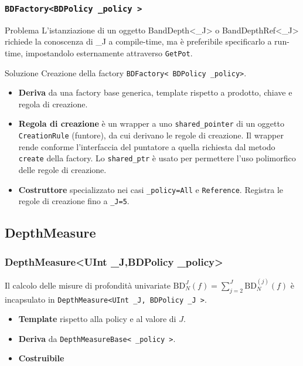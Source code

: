\documentclass[9pt]{beamer}
\begin{document}
\begin{frame}
 \frametitle{\tt BDFactory<BDPolicy \_policy >}
\begin{alertblock}{Problema}
L’istanziazione di un oggetto BandDepth<\_J> o BandDepthRef<\_J> richiede la conoscenza di \_J a compile-time, ma \`e preferibile specificarlo a run-time,
impostandolo esternamente attraverso \texttt{GetPot}. 
\end{alertblock}
\pause
\begin{block}{Soluzione}
 Creazione della factory \texttt{BDFactory< BDPolicy \_policy>}.
\end{block}
\pause
\begin{itemize}
 \item \textbf{Deriva} da una factory base generica, template rispetto a prodotto, chiave e regola di creazione.
\item \textbf{Regola di creazione} \`e un wrapper a uno \texttt{shared\_pointer} di un oggetto \texttt{CreationRule} (funtore), da cui derivano le regole di creazione. Il wrapper 
		    rende conforme l'interfaccia del puntatore a quella richiesta dal metodo \texttt{create} della factory. Lo \texttt{shared\_ptr} \`e usato per permettere l'uso polimorfico
		    delle regole di creazione.
\item \textbf{Costruttore} specializzato nei casi \texttt{\_policy=All} e \texttt{Reference}. Registra le regole di creazione fino a \texttt{\_J=5}.
\end{itemize}

\end{frame}





\subsection{DepthMeasure}

\begin{frame}
\frametitle{\ttfamily DepthMeasure<UInt \_J,BDPolicy \_policy>}
 Il calcolo delle misure di profondità univariate $\text{BD}^J_N\left( f \right) = \sum_{j=2}^J \text{BD}^{(j)}_N\left(f\right)$ \`e incapsulato in \texttt{DepthMeasure<UInt \_J, BDPolicy _J >}.\\

\begin{itemize}
 \item \textbf{Template} rispetto alla policy e al valore di $J$.
 \item \textbf{Deriva} da \texttt{DepthMeasureBase< _policy >}.
 \item \textbf{Costruibile} 
\end{itemize}


\end{frame}
\end{document}
